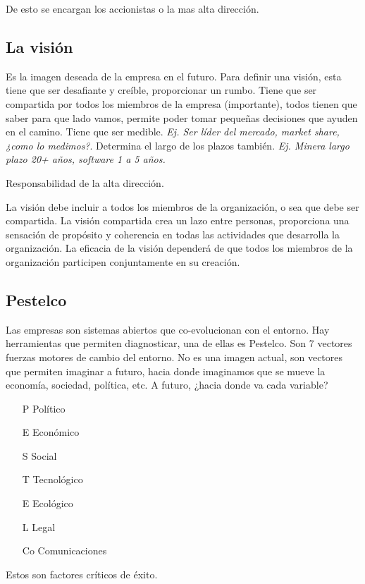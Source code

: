 \documentclass[titlepage,a4paper]{article}
\begin{document}
De esto se encargan los accionistas o la mas alta dirección.

\subsection{La visión}
Es la imagen deseada de la empresa en el futuro. Para definir una visión, esta tiene que ser desafiante y creíble, proporcionar un rumbo. Tiene que ser compartida por todos los miembros de la empresa (importante), todos tienen que saber para que lado vamos, permite poder tomar pequeñas decisiones que ayuden en el camino. Tiene que ser medible. \textit{Ej. Ser líder del mercado, market share, ¿como lo medimos?}. Determina el largo de los plazos también. \textit{Ej. Minera largo plazo 20+ años, software 1 a 5 años.}

Responsabilidad de la alta dirección.

La visión debe incluir a todos los miembros de la organización, o sea que debe ser compartida. La visión compartida crea un lazo entre personas, proporciona una sensación de propósito y coherencia en todas las actividades que desarrolla la organización. La eficacia de la visión dependerá de que todos los miembros de la organización participen conjuntamente en su creación. 

\subsection{Pestelco}
Las empresas son sistemas abiertos que co-evolucionan con el entorno. Hay herramientas que permiten diagnosticar, una de ellas es Pestelco. Son 7 vectores fuerzas motores de cambio del entorno. No es una imagen actual, son vectores que permiten imaginar a futuro, hacia donde imaginamos que se mueve la economía, sociedad, política, etc. A futuro, ¿hacia donde va cada variable?

\begin{itemize}
    \item[P] Político
    \item[E] Económico
    \item[S] Social
    \item[T] Tecnológico
    \item[E] Ecológico
    \item[L] Legal
    \item[Co] Comunicaciones
\end{itemize}

Estos son factores críticos de éxito.
\end{document}
